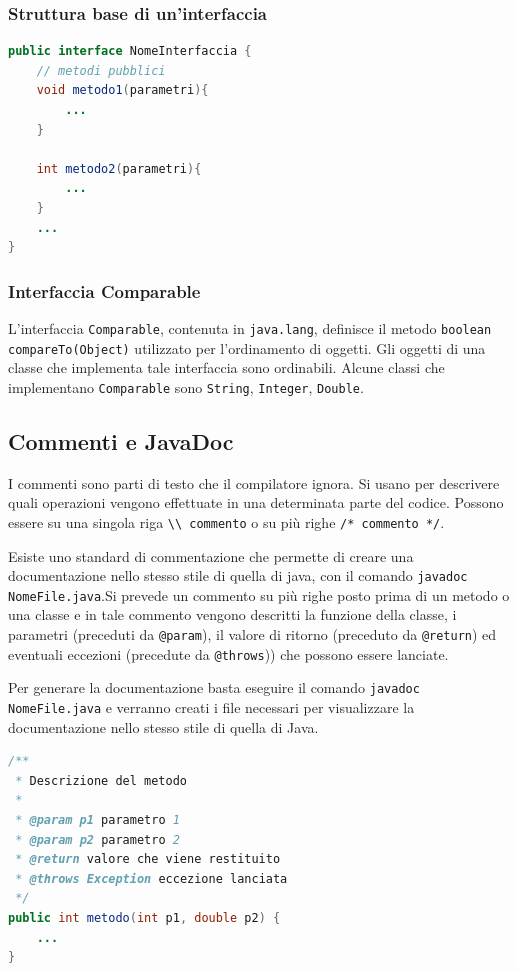 \documentclass{article}
\begin{document}
\subsubsection*{Struttura base di un'interfaccia}
\begin{lstlisting}[language=Java]
public interface NomeInterfaccia {
	// metodi pubblici
	void metodo1(parametri){
		...
	}

	int metodo2(parametri){
		...
	}
	...
}
\end{lstlisting}

\subsubsection*{Interfaccia Comparable}
L'interfaccia \verb|Comparable|, contenuta in \verb|java.lang|, definisce il metodo \verb|boolean compareTo(Object)|
utilizzato per l'ordinamento di oggetti. Gli oggetti di una classe che implementa tale interfaccia sono ordinabili.
Alcune classi che implementano \verb|Comparable| sono \verb|String|, \verb|Integer|, \verb|Double|.

\subsection{Commenti e JavaDoc}
I commenti sono parti di testo che il compilatore ignora. Si usano per descrivere quali operazioni vengono effettuate
in una determinata parte del codice. Possono essere su una singola riga \verb|\\ commento| o su più righe \verb|/* commento */|.

Esiste uno standard di commentazione che permette di creare una documentazione nello stesso stile di quella di java,
con il  comando \verb|javadoc NomeFile.java|.Si prevede un commento su più righe posto prima di un metodo o una classe
e in tale commento vengono descritti la funzione della classe, i parametri (preceduti da \verb|@param|), il valore di
ritorno (preceduto da \verb|@return|) ed eventuali eccezioni (precedute da \verb|@throws|)) che possono essere lanciate.

Per generare la documentazione basta eseguire il comando \verb|javadoc NomeFile.java| e verranno creati i file necessari
per visualizzare la documentazione nello stesso stile di quella di Java.

\begin{lstlisting}[language=Java]
/**
 * Descrizione del metodo
 * 
 * @param p1 parametro 1
 * @param p2 parametro 2
 * @return valore che viene restituito
 * @throws Exception eccezione lanciata
 */
public int metodo(int p1, double p2) {
	...
}
\end{lstlisting}
\end{document}
